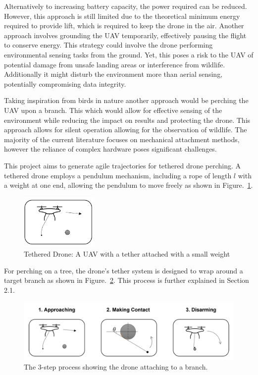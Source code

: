 Alternatively to increasing battery capacity, the power required can be reduced.
However, this approach is still limited due to the theoretical minimum energy required to provide lift, which is required to keep the drone in the air.
Another approach involves grounding the UAV temporarily, effectively pausing the flight to conserve energy.
This strategy could involve the drone performing environmental sensing tasks from the ground.
Yet, this poses a risk to the UAV of potential damage from unsafe landing areas or interference from wildlife.
Additionally it might disturb the environment more than aerial sensing, potentially compromising data integrity.

Taking inspiration from birds in nature another approach would be perching the UAV upon a branch.
This which would allow for effective sensing of the environment while reducing the impact on results and protecting the drone.
This approach allows for silent operation allowing for the observation of wildlife.
The majority of the current literature focuses on mechanical attachment methods, however the reliance of complex hardware poses significant challenges.

This project aims to generate agile trajectories for tethered drone perching.
A tethered drone employs a pendulum mechanism, including a rope of length $l$ with a weight at one end, allowing the pendulum to move freely as shown in Figure.~\ref*{fig:intro-tethered-drone}.


\begin{figure}[htbp]
  \centering
  \includegraphics[width=0.33\textwidth]{introduction/tetheredDroneImage.png}
  \caption{Tethered Drone: A UAV with a tether attached with a small weight}
\label{fig:intro-tethered-drone}
\end{figure}

For perching on a tree, the drone's tether system is designed to wrap around a target branch as shown in Figure.~\ref{fig:intro-wrapping}.
This process is further explained in Section 2.1.

\begin{figure}[htbp]
  \centering
  \includegraphics[width=\textwidth]{introduction/dronePerching.png}
  \caption{The 3-step process showing the drone attaching to a branch.}
\label{fig:intro-wrapping}
\end{figure}

